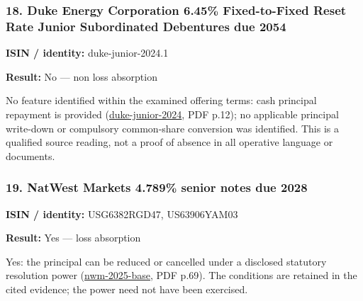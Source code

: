 \documentclass[
  11pt,
]{article}
\begin{document}
\begin{minipage}{\linewidth}

\hypertarget{duke-energy-corporation-6.45-fixed-to-fixed-reset-rate-junior-subordinated-debentures-due-2054}{%
\subsubsection{18. Duke Energy Corporation 6.45\% Fixed-to-Fixed Reset
Rate Junior Subordinated Debentures due
2054}\label{duke-energy-corporation-6.45-fixed-to-fixed-reset-rate-junior-subordinated-debentures-due-2054}}

\textbf{ISIN / identity:} duke-junior-2024.1

\textbf{Result:} No --- non loss absorption

No feature identified within the examined offering terms: cash principal
repayment is provided
(\href{https://d18rn0p25nwr6d.cloudfront.net/CIK-0001326160/36bfc95c-f014-45bb-91c5-32d0eec52bb2.pdf}{duke-junior-2024},
PDF p.12); no applicable principal write-down or compulsory common-share
conversion was identified. This is a qualified source reading, not a
proof of absence in all operative language or documents.

\end{minipage}
\par\addvspace{1.1em}

\begin{minipage}{\linewidth}

\hypertarget{natwest-markets-4.789-senior-notes-due-2028}{%
\subsubsection{19. NatWest Markets 4.789\% senior notes due
2028}\label{natwest-markets-4.789-senior-notes-due-2028}}

\textbf{ISIN / identity:} USG6382RGD47, US63906YAM03

\textbf{Result:} Yes --- loss absorption

Yes: the principal can be reduced or cancelled under a disclosed
statutory resolution power
(\href{https://www.rns-pdf.londonstockexchange.com/rns/9779A_2-2025-3-17.pdf}{nwm-2025-base},
PDF p.69). The conditions are retained in the cited evidence; the power
need not have been exercised.

\end{minipage}
\par\addvspace{1.1em}
\end{document}
